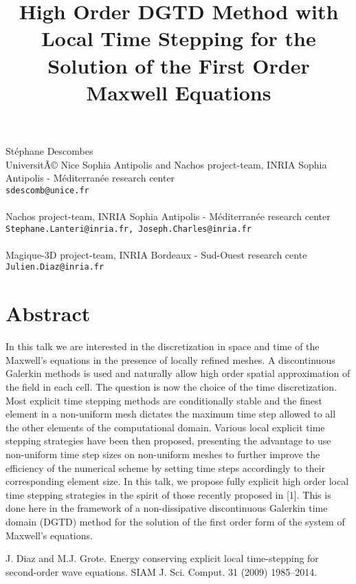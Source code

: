 \title{High Order DGTD Method with Local Time Stepping for the Solution of the First Order Maxwell Equations}
 \author{} \institute{}
\maketitle
\begin{center}
{\large St\'ephane Descombes}\\
UniversitÃ© Nice Sophia Antipolis and {\sc Nachos} project-team, INRIA Sophia Antipolis - M\'editerran\'ee research center\\
{\tt sdescomb@unice.fr}
\\ \vspace{4mm}{\large St\'ephane Lanteri, Jospeh Charles}\\
{\sc Nachos} project-team, INRIA Sophia Antipolis - M\'editerran\'ee  research center\\
{\tt Stephane.Lanteri@inria.fr, Joseph.Charles@inria.fr}
\\ \vspace{4mm}{\large Julien Diaz}\\
{\sc Magique-3D} project-team, INRIA Bordeaux - Sud-Ouest                research cente\\
{\tt Julien.Diaz@inria.fr}

\end{center}

\section*{Abstract}

In this talk we are interested in the discretization in space and time of the
Maxwell's equations in the presence of locally refined meshes.
A discontinuous Galerkin methods is
used and naturally allow high order spatial
approximation of the field in each cell.
The question is now the choice of the
time discretization. Most explicit time stepping methods are conditionally stable and
the finest element in a non-uniform mesh dictates the maximum time step allowed
to all the other elements of the computational domain. 
Various local explicit time stepping strategies have been then proposed,
presenting the advantage to use non-uniform time step sizes on non-uniform meshes to
further improve the efficiency of the numerical scheme by setting time steps accordingly to their corresponding element size.
In this talk, we propose fully explicit high order local time stepping strategies in the spirit of those
recently proposed in [1]. This is done here in the framework
of a non-dissipative discontinuous Galerkin time domain (DGTD) method for the solution of the first order form of the system of Maxwell's equations.


\begin{thebibliography}{10}

{\sc J. Diaz and M.J. Grote}. {Energy conserving explicit local time-stepping for second-order wave equations}. SIAM J. Sci. Comput. 31 (2009) 1985--2014.

\end{thebibliography}
